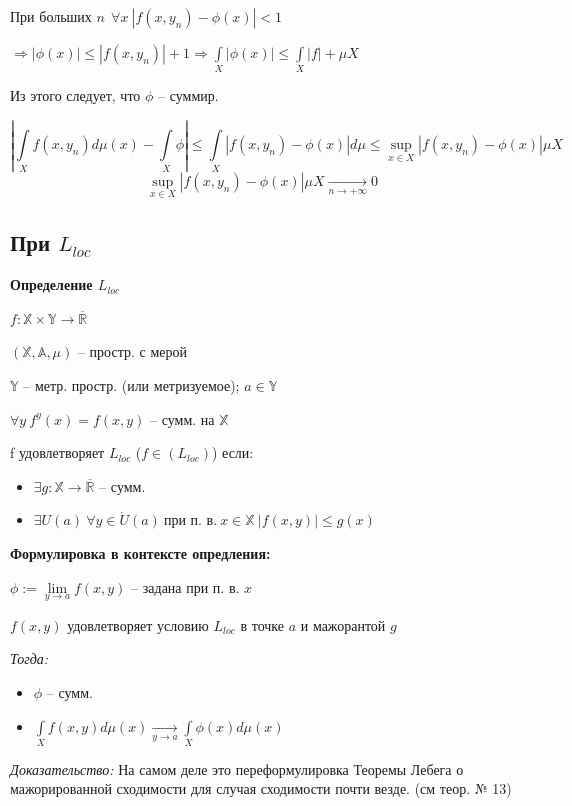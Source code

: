 \documentclass[paper=a4, fontsize=17pt]{article}
\begin{document}
При больших $ n ~ ~ \forall x ~ |f(x, y_n) - \phi(x) | < 1$

$ \Rightarrow | \phi(x) | \leq | f(x, y_n) | + 1
  \Rightarrow \int\limits_X | \phi(x) | \leq \int\limits_X|f| + \mu X$

Из этого следует, что $ \phi $ -- суммир.

$$ |\int\limits_X f(x, y_n) d\mu(x) - \int\limits_X \phi |
\leq \int\limits_X | f(x, y_n) - \phi(x) | d\mu
\leq \sup\limits_{x \in X} | f(x, y_n) - \phi(x)| \mu X $$
$$\sup\limits_{x \in X} | f(x, y_n) - \phi(x)| \mu X \underset{n \rightarrow +\infty}{\longrightarrow} 0 $$

\subsection{При $L_{loc}$}

\textbf{Определение $ L_{loc} $}

$ f : \mathbb{X} \times \mathbb{Y} \rightarrow \overline{\mathbb{R}}$

$ (\mathbb{X}, \mathbb{A}, \mu) $ -- простр. с мерой

$ \mathbb{Y} $ -- метр. простр. (или метризуемое); $ a \in \mathbb{Y} $


$ \forall y ~ f^y(x) = f(x, y) $ -- сумм. на $ \mathbb{X} $

f удовлетворяет $ L_{loc} $ ($ f \in (L_{loc}) $) если:
\begin{itemize}
	\item  $ \exists g : \mathbb{X} \rightarrow \overline{\mathbb{R}} $ -- сумм.
	\item $ \exists U(a) ~ \forall y \in \dot{U} (a) ~ \text{при п. в.} ~ x \in \mathbb{X} ~ |f(x, y)| \leq g(x)$
\end{itemize}
\textbf{Формулировка в контексте опредления:}

$ \phi := \lim\limits_{y \rightarrow a} f(x, y) $ -- задана при п. в. $ x $

$ f(x,y) $ удовлетворяет условию $ L_{loc} $ в точке $ a $ и мажорантой $ g $


\emph{Тогда:}

\begin{itemize}
	\item $ \phi $ -- сумм.
	\item $ \int\limits_{X} f(x, y) d\mu (x) \underset{y \rightarrow a}{\longrightarrow} \int\limits_{X} \phi(x) d\mu(x) $
\end{itemize}

\emph{Доказательство:} На самом деле это переформулировка Теоремы Лебега о мажорированной сходимости для случая сходимости почти везде. (см теор. № 13)
\end{document}
